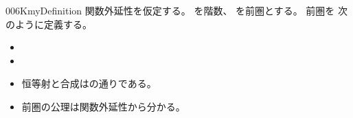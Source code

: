 \documentclass[index]{subfiles}
\begin{document}
\begin{myBlock}{006K}{myDefinition}
  関数外延性を仮定する。
  を階数、
  を前圏とする。
  前圏を
  次のように定義する。
  \begin{itemize}
  \item {}
  \item {}
  \item 恒等射と合成はの通りである。
  \item 前圏の公理は関数外延性から分かる。
  \end{itemize}
\end{myBlock}
\end{document}
